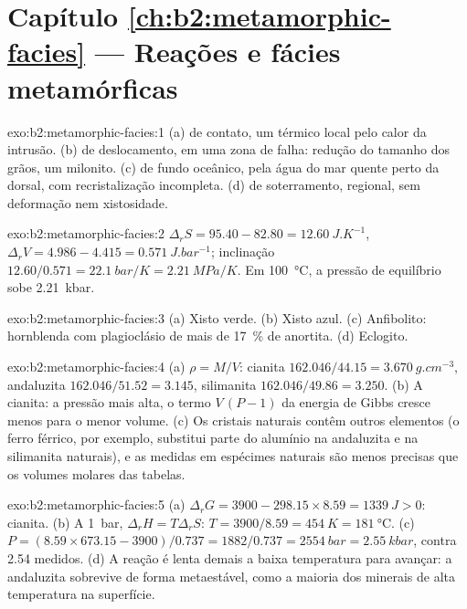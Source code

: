 \section*{Capítulo \ref{ch:b2:metamorphic-facies} --- Reações e fácies metamórficas}

\begin{solution}{exo:b2:metamorphic-facies:1}
(a)  de contato, um  térmico local pelo calor da intrusão.
(b)  de deslocamento, em uma zona de falha: redução do tamanho dos grãos, um milonito.
(c)  de fundo oceânico, pela água do mar quente perto da dorsal, com
recristalização incompleta. (d)  de soterramento, regional, sem deformação nem
xistosidade.
\end{solution}

\begin{solution}{exo:b2:metamorphic-facies:2}
$\Delta_r S = 95.40 - 82.80 = \qty{12.60}{J.K^{-1}}$, $\Delta_r V = 4.986 - 4.415 =
\qty{0.571}{J.bar^{-1}}$; inclinação $12.60/0.571 = \qty{22.1}{bar/K} = \qty{2.21}{MPa/K}$.
Em \qty{100}{\celsius}, a pressão de equilíbrio sobe \qty{2.21}{kbar}.
\end{solution}

\begin{solution}{exo:b2:metamorphic-facies:3}
(a) Xisto verde. (b) Xisto azul. (c) Anfibolito: hornblenda com plagioclásio de mais
de \qty{17}{\percent} de anortita. (d) Eclogito.
\end{solution}

\begin{solution}{exo:b2:metamorphic-facies:4}
(a) $\rho = M/V$: cianita $162.046/44.15 = \qty{3.670}{g.cm^{-3}}$, andaluzita
$162.046/51.52 = 3.145$, silimanita $162.046/49.86 = 3.250$. (b) A cianita: a pressão mais
alta, o termo $V\,(P - 1)$ da energia de Gibbs cresce menos para o menor volume.
(c) Os cristais naturais contêm outros elementos (o ferro férrico, por exemplo, substitui parte do
alumínio na andaluzita e na silimanita naturais), e as medidas em
espécimes naturais são menos precisas que os volumes molares das tabelas.
\end{solution}

\begin{solution}{exo:b2:metamorphic-facies:5}
(a) $\Delta_r G = 3900 - 298.15\times8.59 = \qty{+1339}{J} > 0$: cianita. (b) A
\qty{1}{bar}, $\Delta_r H = T\Delta_r S$: $T = 3900/8.59 = \qty{454}{K} =
\qty{181}{\celsius}$. (c) $P = (8.59\times673.15 - 3900)/0.737 = 1882/0.737 =
\qty{2554}{bar} = \qty{2.55}{kbar}$, contra 2.54 medidos. (d) A reação é lenta demais
a baixa temperatura para avançar: a andaluzita sobrevive de forma metaestável, como a maioria dos minerais
de alta temperatura na superfície.
\end{solution}

